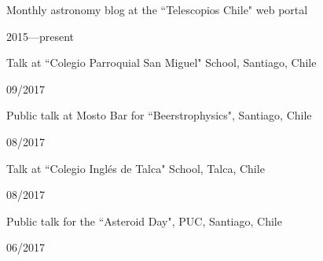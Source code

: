 \documentclass[11pt, a4paper]{article} %
\begin{document}

\begin{minipage}[t]{0.7\textwidth}
\begin{flushleft}%
  \setlength{\leftskip}{0.2cm}%
Monthly astronomy blog at the ``Telescopios Chile" web portal
\end{flushleft}
\end{minipage}
\begin{minipage}[t]{0.3\textwidth}
\hfill 2015---present
\end{minipage}

\begin{minipage}[t]{0.7\textwidth}
\begin{flushleft}%
  \setlength{\leftskip}{0.2cm}%
Talk at ``Colegio Parroquial San Miguel" School, Santiago, Chile
\end{flushleft}
\end{minipage}
\begin{minipage}[t]{0.3\textwidth}
\hfill 09/2017
\end{minipage}

\begin{minipage}[t]{0.7\textwidth}
\begin{flushleft}%
  \setlength{\leftskip}{0.2cm}%
Public talk at Mosto Bar for ``Beerstrophysics", Santiago, Chile
\end{flushleft}
\end{minipage}
\begin{minipage}[t]{0.3\textwidth}
\hfill 08/2017
\end{minipage}

\begin{minipage}[t]{0.7\textwidth}
\begin{flushleft}%
  \setlength{\leftskip}{0.2cm}%
Talk at ``Colegio Ingl\'es de Talca" School, Talca, Chile
\end{flushleft}
\end{minipage}
\begin{minipage}[t]{0.3\textwidth}
\hfill 08/2017
\end{minipage}

\begin{minipage}[t]{0.7\textwidth}
\begin{flushleft}%
  \setlength{\leftskip}{0.2cm}%
Public talk for the ``Asteroid Day", PUC, Santiago, Chile
\end{flushleft}
\end{minipage}
\begin{minipage}[t]{0.3\textwidth}
\hfill 06/2017
\end{minipage}
\end{document}
